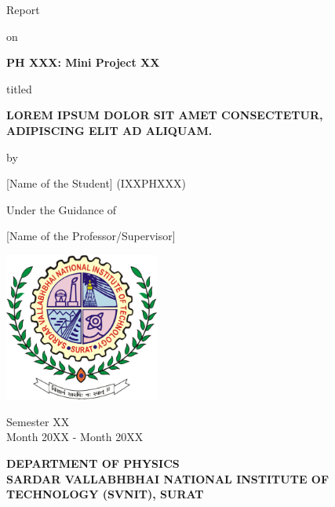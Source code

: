 \begin{center}
    {\Large Report}
    \vspace{8pt}

    {\large {on}}
    \vspace{8pt}

    {\Large \textbf{PH XXX: Mini Project XX}}
    \vspace{8pt}

    {\large {titled}}
    \vspace{8pt}

    \begin{spacing}{1.75}
        {\LARGE \textbf{LOREM IPSUM DOLOR SIT AMET CONSECTETUR, ADIPISCING ELIT AD ALIQUAM.}}
    \end{spacing}
    \vspace{8pt}
    
    {\large {by}} 
    \vspace{8pt}
    
    {\Large [Name of the Student] (IXXPHXXX)} 
    \vspace{8pt} 
    
    {\Large Under the Guidance of}

    {\Large [Name of the Professor/Supervisor]}
    \vspace{10pt}
    
    \includegraphics[width = 2in]{images/svnit_logo.png}
    \vspace{10pt}

    {\large Semester XX  \\ 
    Month 20XX - Month 20XX}

    \vspace{6pt}
    
    \begin{spacing}{1.25}
    {\large \textbf{DEPARTMENT OF PHYSICS \\ 
    SARDAR VALLABHBHAI NATIONAL INSTITUTE OF TECHNOLOGY (SVNIT), SURAT}} \\ 
    \end{spacing}

\end{center}